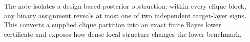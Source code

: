 The note isolates a design-based posterior obstruction: within every clique block, any binary assignment reveals at most one of two independent target-layer signs.  This converts a supplied clique partition into an exact finite Bayes lower certificate and exposes how dense local structure changes the lower benchmark.